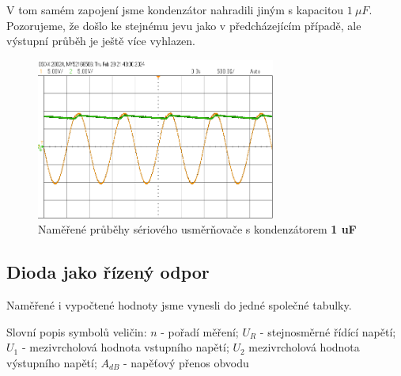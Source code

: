 \documentclass[a4paper, czech]{article}
\begin{document}
\newpage

V tom samém zapojení jsme kondenzátor nahradili jiným s kapacitou $1\ \mu F$. Pozorujeme, že došlo ke stejnému jevu jako v předcházejícím případě, ale výstupní průběh je ještě více vyhlazen.

\begin{figure}[H]
    \centering
    \includegraphics[width=0.7\textwidth]{scope_3.png}
    \caption{Naměřené průběhy sériového usměrňovače s kondenzátorem \textbf{1 uF}}
\end{figure}

\subsection{Dioda jako řízený odpor}

Naměřené i vypočtené hodnoty jsme vynesli do jedné společné tabulky.

Slovní popis symbolů veličin: $n$ - pořadí měření; $U_R$ - stejnosměrné řídící napětí; $U_1$ - mezivrcholová hodnota vstupního napětí; $U_2$ mezivrcholová hodnota výstupního napětí; $A_{dB}$ - napěťový přenos obvodu
\end{document}
